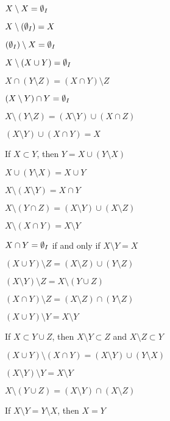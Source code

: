 \documentclass{article}
\begin{document}
\begin{thm}
\item\label{pboole:58} $X \setminus X = \emptyset_{I}$
\item\label{pboole:59} $X \setminus (\emptyset_{I}) = X$
\item\label{pboole:60} $(\emptyset_{I}) \setminus X = \emptyset_{I}$
\item\label{pboole:61} $X \setminus (X \cup Y) = \emptyset_{I}$
\item\label{pboole:62} $X \cap (Y \setminus Z) = (X \cap Y) \setminus Z$
\item\label{pboole:63} $(X \setminus Y) \cap Y = \emptyset_{I}$
\item\label{pboole:64} $X \setminus (Y \setminus Z) = (X \setminus Y) \cup (X \cap Z)$
\item\label{pboole:65} $(X \setminus Y) \cup (X \cap Y) = X$
\item\label{pboole:66} If $X \subset Y$, then $Y = X \cup (Y \setminus X)$
\item\label{pboole:67} $X \cup (Y \setminus X) = X \cup Y$
\item\label{pboole:68} $X \setminus (X \setminus Y) = X \cap Y$
\item\label{pboole:69} $X \setminus (Y \cap Z) = (X \setminus Y) \cup (X \setminus Z)$
\item\label{pboole:70} $X \setminus (X \cap Y) = X \setminus Y$
\item\label{pboole:71} $X \cap Y = \emptyset_{I}$ if and only if $X \setminus Y = X$
\item\label{pboole:72} $(X \cup Y) \setminus Z = (X \setminus Z) \cup (Y \setminus Z)$
\item\label{pboole:73} $(X \setminus Y) \setminus Z = X \setminus (Y \cup Z)$
\item\label{pboole:74} $(X \cap Y) \setminus Z = (X \setminus Z) \cap (Y \setminus Z)$
\item\label{pboole:75} $(X \cup Y) \setminus Y = X \setminus Y$
\item\label{pboole:76} If $X \subset Y \cup Z$, then $X \setminus Y \subset Z$ and $X \setminus Z \subset Y$
\item\label{pboole:77} $(X \cup Y) \setminus (X \cap Y) = (X \setminus Y) \cup (Y \setminus X)$
\item\label{pboole:78} $(X \setminus Y) \setminus Y = X \setminus Y$
\item\label{pboole:79} $X \setminus (Y \cup Z) = (X \setminus Y) \cap (X \setminus Z)$
\item\label{pboole:80} If $X \setminus Y = Y \setminus X$, then $X=Y$

\end{thm}
\end{document}

